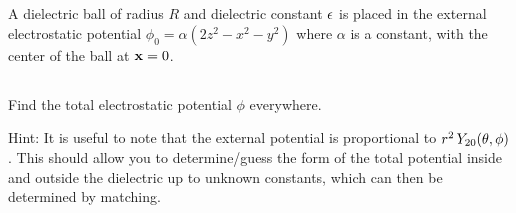 \documentclass[11pt]{article}
\newenvironment{statement}[1]
{
	\section{#1}
	\color{darkgray}
	\ignorespaces
}
{
}
\newenvironment{problem}
{
	\subsection{}
	\color{darkgray}
    \ignorespaces
}
{

}
\begin{document}
\newcommand{\phio}{\phi_0}
\newcommand{\alp}{\alpha}
\newcommand{\cE}{\mathcal{E}}
\newcommand{\cEint}{\cE_\text{int}}
\newcommand{\rhof}{\rho_f}
\newcommand{\evphi}{\ev{\phi}}
\newcommand{\evrhof}{\ev{\rhof}}
\newcommand{\vP}{\vb{P}}
\newcommand{\evP}{\ev{\vP}}
\newcommand{\divP}{\div{\evP}}
\newcommand{\lap}{\laplacian}

\newcommand{\Alm}{A_{l m}}
\newcommand{\Blm}{B_{l m}}
\newcommand{\tif}{\text{if }}
\newcommand{\nh}{\vb{\hat{n}}}
\newcommand{\vE}{\vb{E}}
\newcommand{\evE}{\ev{\vE}}
\newcommand{\Er}{E_r}
\newcommand{\evEr}{\ev{\Er}}
\newcommand{\vD}{\vb{D}}
\newcommand{\evD}{\ev{\vD}}
\newcommand{\tfor}{\quad \text{for }}
\newcommand{\Ytotv}{Y_{2 0}\tv}

\begin{statement}{}
	A dielectric ball of radius $R$ and dielectric constant $\epsilon$ is placed in the external electrostatic potential $\phio = \alp (2z^2 - x^2 - y^2)$ where $\alp$ is a constant, with the center of the ball at $\vb{x} = 0$.
\end{statement}

\begin{problem}
	Find the total electrostatic potential $\phi$ everywhere.
	
	Hint: It is useful to note that the external potential is proportional to $r^2 \, \Ytotv$.  This should allow you to determine/guess the form of the total potential inside and outside the dielectric up to unknown constants, which can then be determined by matching.
\end{problem}
\end{document}
